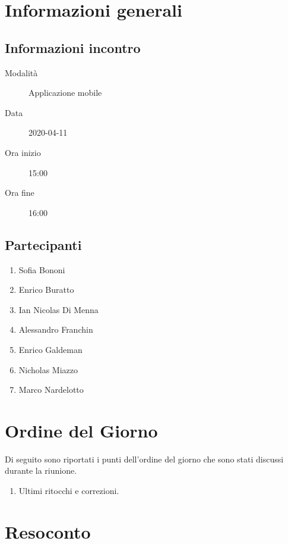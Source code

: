\documentclass{article}
\begin{document}


\section{Informazioni generali}%
\label{sec:informazioni_generali}

\subsection{Informazioni incontro}%
\label{sub:informazioni_incontro}

\begin{description}
  \item[Modalità] Applicazione mobile 
  \item[Data] 2020-04-11
  \item[Ora inizio] 15:00
  \item[Ora fine] 16:00
\end{description}

\subsection{Partecipanti}%
\label{sub:partecipanti}

\begin{enumerate}
  \item Sofia Bononi
  \item Enrico Buratto
  \item Ian Nicolas Di Menna
  \item Alessandro Franchin
  \item Enrico Galdeman
  \item Nicholas Miazzo
  \item Marco Nardelotto
\end{enumerate}

\section{Ordine del Giorno}%
\label{ordine_del_giorno}
Di seguito sono riportati i punti dell'ordine del giorno che sono stati discussi durante la riunione.
\begin{enumerate}
  \item Ultimi ritocchi e correzioni.
\end{enumerate}

\section{Resoconto}%
\label{resoconto}
\end{document}
